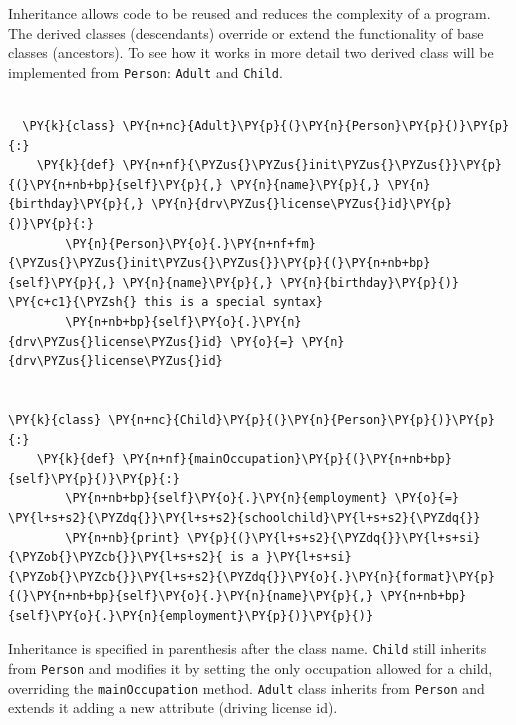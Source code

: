 Inheritance allows code to be reused and reduces the complexity of a
program. The derived classes (descendants) override or extend the
functionality of base classes (ancestors).
To see how it works in more detail two derived class will be implemented from \texttt{Person}: \texttt{Adult} and \texttt{Child}.

\begin{tcolorbox}[breakable, size=fbox, boxrule=1pt, pad at break*=1mm,colback=cellbackground, colframe=cellborder]
\begin{Verbatim}[commandchars=\\\{\}]

  \PY{k}{class} \PY{n+nc}{Adult}\PY{p}{(}\PY{n}{Person}\PY{p}{)}\PY{p}{:}
    \PY{k}{def} \PY{n+nf}{\PYZus{}\PYZus{}init\PYZus{}\PYZus{}}\PY{p}{(}\PY{n+nb+bp}{self}\PY{p}{,} \PY{n}{name}\PY{p}{,} \PY{n}{birthday}\PY{p}{,} \PY{n}{drv\PYZus{}license\PYZus{}id}\PY{p}{)}\PY{p}{:}
        \PY{n}{Person}\PY{o}{.}\PY{n+nf+fm}{\PYZus{}\PYZus{}init\PYZus{}\PYZus{}}\PY{p}{(}\PY{n+nb+bp}{self}\PY{p}{,} \PY{n}{name}\PY{p}{,} \PY{n}{birthday}\PY{p}{)} \PY{c+c1}{\PYZsh{} this is a special syntax}
        \PY{n+nb+bp}{self}\PY{o}{.}\PY{n}{drv\PYZus{}license\PYZus{}id} \PY{o}{=} \PY{n}{drv\PYZus{}license\PYZus{}id}

        
\PY{k}{class} \PY{n+nc}{Child}\PY{p}{(}\PY{n}{Person}\PY{p}{)}\PY{p}{:}
    \PY{k}{def} \PY{n+nf}{mainOccupation}\PY{p}{(}\PY{n+nb+bp}{self}\PY{p}{)}\PY{p}{:}
        \PY{n+nb+bp}{self}\PY{o}{.}\PY{n}{employment} \PY{o}{=} \PY{l+s+s2}{\PYZdq{}}\PY{l+s+s2}{schoolchild}\PY{l+s+s2}{\PYZdq{}}
        \PY{n+nb}{print} \PY{p}{(}\PY{l+s+s2}{\PYZdq{}}\PY{l+s+si}{\PYZob{}\PYZcb{}}\PY{l+s+s2}{ is a }\PY{l+s+si}{\PYZob{}\PYZcb{}}\PY{l+s+s2}{\PYZdq{}}\PY{o}{.}\PY{n}{format}\PY{p}{(}\PY{n+nb+bp}{self}\PY{o}{.}\PY{n}{name}\PY{p}{,} \PY{n+nb+bp}{self}\PY{o}{.}\PY{n}{employment}\PY{p}{)}\PY{p}{)}
\end{Verbatim}
\end{tcolorbox}

Inheritance is specified in parenthesis after the class name.
\texttt{Child} still inherits from \texttt{Person} and modifies it by setting the only occupation allowed for a child, overriding the \texttt{mainOccupation} method.
\texttt{Adult} class inherits from \texttt{Person} and extends it adding
a new attribute (driving license id). 


